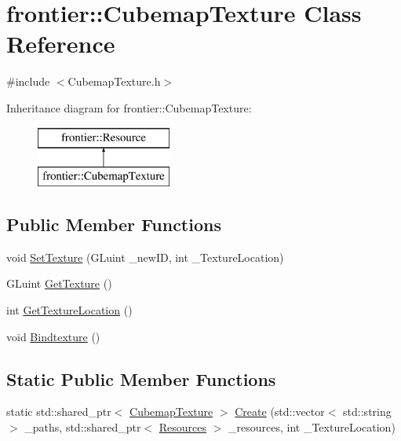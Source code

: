 \hypertarget{classfrontier_1_1_cubemap_texture}{}\section{frontier\+:\+:Cubemap\+Texture Class Reference}
\label{classfrontier_1_1_cubemap_texture}


{\ttfamily \#include $<$Cubemap\+Texture.\+h$>$}

Inheritance diagram for frontier\+:\+:Cubemap\+Texture\+:\begin{figure}[H]
\begin{center}
\leavevmode
\includegraphics[height=2.000000cm]{classfrontier_1_1_cubemap_texture}
\end{center}
\end{figure}
\subsection*{Public Member Functions}
\begin{DoxyCompactItemize}
\item 
void \hyperlink{classfrontier_1_1_cubemap_texture_a479becfad071909e952d728cf6a8dacb}{Set\+Texture} (G\+Luint \+\_\+new\+ID, int \+\_\+\+Texture\+Location)
\item 
G\+Luint \hyperlink{classfrontier_1_1_cubemap_texture_a18b6320619de29cad6acd5fe50c42439}{Get\+Texture} ()
\item 
int \hyperlink{classfrontier_1_1_cubemap_texture_a091f7bd4e5233e5ce5f034ca17588387}{Get\+Texture\+Location} ()
\item 
void \hyperlink{classfrontier_1_1_cubemap_texture_aeddd79b5a1e438b532baf79be95452c7}{Bindtexture} ()
\end{DoxyCompactItemize}
\subsection*{Static Public Member Functions}
\begin{DoxyCompactItemize}
\item 
static std\+::shared\+\_\+ptr$<$ \hyperlink{classfrontier_1_1_cubemap_texture}{Cubemap\+Texture} $>$ \hyperlink{classfrontier_1_1_cubemap_texture_af9fdc5d920763022ccd3bacf90125075}{Create} (std\+::vector$<$ std\+::string $>$ \+\_\+paths, std\+::shared\+\_\+ptr$<$ \hyperlink{classfrontier_1_1_resources}{Resources} $>$ \+\_\+resources, int \+\_\+\+Texture\+Location)
\end{DoxyCompactItemize}
